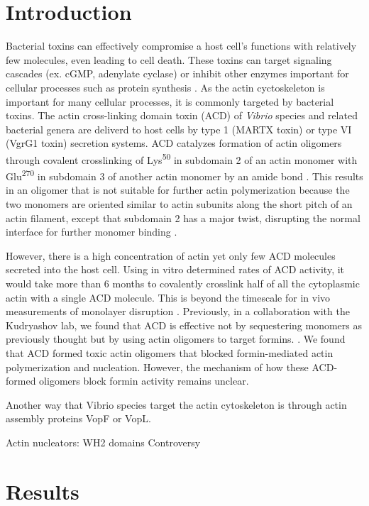 \section{Introduction}\label{ch04-introduction}
Bacterial toxins can effectively compromise a host cell's functions with relatively few molecules, even leading to cell death. These toxins can target signaling cascades (ex. cGMP, adenylate cyclase) or inhibit other enzymes important for cellular processes such as protein synthesis \citep{henkel_toxins_2010}. As the actin cyctoskeleton is important for many cellular processes, it is commonly targeted by bacterial toxins. The actin cross-linking domain toxin (ACD) of \textit{Vibrio} species and related bacterial genera are deliverd to host cells by type 1 (MARTX toxin) or type VI (VgrG1 toxin) secretion systems. ACD catalyzes formation of actin oligomers through covalent crosslinking of Lys\textsuperscript{50} in subdomain 2 of an actin monomer with Glu\textsuperscript{270} in subdomain 3 of another actin monomer by an amide bond \citep{kudryashov_connecting_2008,kudryashova_glutamyl_2012}. This results in an oligomer that is not suitable for further actin polymerization because the two monomers are oriented similar to actin subunits along the short pitch of an actin filament, except that subdomain 2 has a major twist, disrupting the normal interface for further monomer binding \citep{kudryashov_connecting_2008}.  

However, there is a high concentration of actin yet only few ACD molecules secreted into the host cell. Using in vitro determined rates of ACD activity, it would take more than 6 months to covalently crosslink half of all the cytoplasmic actin with a single ACD molecule. This is beyond the timescale for in vivo measurements of monolayer disruption \citep{}. Previously, in a collaboration with the Kudryashov lab, we found that ACD is effective not by sequestering monomers as previously thought but by using actin oligomers to target formins. \citep{heisler_acd_2015}. We found that ACD formed toxic actin oligomers that blocked formin-mediated actin polymerization and nucleation. However, the mechanism of how these ACD-formed oligomers block formin activity remains unclear. 

Another way that Vibrio species target the actin cytoskeleton is through actin assembly proteins VopF or VopL. \citep{burke_bacterial_2017}

Actin nucleators: WH2 domains
	Controversy

\section{Results}\label{ch04-results}

